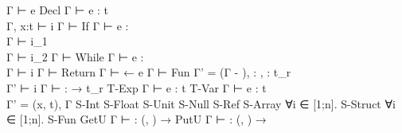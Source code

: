 {{             { Γ ⊢ e }
         }
    {Decl}{ 
              { Γ ⊢ e : t
             \\ Γ, x:t ⊢ i
              }
              { Γ ⊢  }
          }
    {If}{ 
            { Γ ⊢ e : \tInt \\
              Γ ⊢ i_1 \\
              Γ ⊢ i_2
            }
            { Γ ⊢  }
        }
    {While}{ 
               { Γ ⊢ e : \tInt \\
                 Γ ⊢ i
               }
               { Γ ⊢  }
           }
    {Return}{ 
                { Γ ⊢ \vRet ← e }
                { Γ ⊢  }
            }
    {Fun}{ 
             { Γ' = (Γ - \vRet),
                     : ,
                     \vRet : t_r \\
               Γ' ⊢ i
             }
             { Γ ⊢ 
                    :  → t_r
             }
         }
    {T-Exp}{ 
                { Γ ⊢ e : t }
                {  }
            }
    {T-Var}{ 
                { Γ ⊢ e : t \\
                  Γ' = (x, t), Γ
                }
                {  }
            }
    {S-Int}{ 
               { }
               {}
           }
    {S-Float}{ 
                 { }
                 {}
    }
    {S-Unit}{ 
                { }
                {}
    }
    {S-Null}{ 
                { }
                {}
    }
    {S-Ref}{ 
               { }
               {}
    }
    {S-Array}{ 
                 { ∀i ∈ [1;n]. }
                 {  }
    }
    {S-Struct}{ 
                  { ∀i ∈ [1;n].  }
                  { 
                                        {  }
                  }
    }
    {S-Fun}{ 
               { }
               {}
    }
    {GetU}{ 
              { }
              { Γ ⊢ \cfuF : (, ) → \tInt }
    }
    {PutU}{ 
              { }
              { Γ ⊢ \ctuF : (, ) → \tInt }
}}
